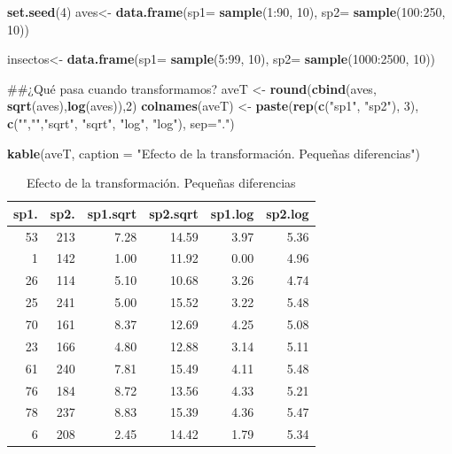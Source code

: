 \documentclass[]{book}
\newenvironment{Shaded}{\begin{snugshade}}{\end{snugshade}}
\newcommand{\KeywordTok}[1]{\textcolor[rgb]{0.13,0.29,0.53}{\textbf{{#1}}}}
\newcommand{\DataTypeTok}[1]{\textcolor[rgb]{0.13,0.29,0.53}{{#1}}}
\newcommand{\DecValTok}[1]{\textcolor[rgb]{0.00,0.00,0.81}{{#1}}}
\newcommand{\StringTok}[1]{\textcolor[rgb]{0.31,0.60,0.02}{{#1}}}
\newcommand{\NormalTok}[1]{{#1}}
\begin{document}
\begin{Shaded}
\begin{Highlighting}[]
\KeywordTok{set.seed}\NormalTok{(}\DecValTok{4}\NormalTok{)}
\NormalTok{aves<-}\StringTok{ }\KeywordTok{data.frame}\NormalTok{(}\DataTypeTok{sp1=} \KeywordTok{sample}\NormalTok{(}\DecValTok{1}\NormalTok{:}\DecValTok{90}\NormalTok{, }\DecValTok{10}\NormalTok{), }\DataTypeTok{sp2=} \KeywordTok{sample}\NormalTok{(}\DecValTok{100}\NormalTok{:}\DecValTok{250}\NormalTok{, }\DecValTok{10}\NormalTok{))}

\NormalTok{insectos<-}\StringTok{ }\KeywordTok{data.frame}\NormalTok{(}\DataTypeTok{sp1=} \KeywordTok{sample}\NormalTok{(}\DecValTok{5}\NormalTok{:}\DecValTok{99}\NormalTok{, }\DecValTok{10}\NormalTok{), }\DataTypeTok{sp2=} \KeywordTok{sample}\NormalTok{(}\DecValTok{1000}\NormalTok{:}\DecValTok{2500}\NormalTok{, }\DecValTok{10}\NormalTok{))}

\NormalTok{##¿Qué pasa cuando transformamos?}
\NormalTok{aveT <-}\StringTok{ }\KeywordTok{round}\NormalTok{(}\KeywordTok{cbind}\NormalTok{(aves, }\KeywordTok{sqrt}\NormalTok{(aves),}\KeywordTok{log}\NormalTok{(aves)),}\DecValTok{2}\NormalTok{)}
\KeywordTok{colnames}\NormalTok{(aveT) <-}\StringTok{ }\KeywordTok{paste}\NormalTok{(}\KeywordTok{rep}\NormalTok{(}\KeywordTok{c}\NormalTok{(}\StringTok{"sp1"}\NormalTok{, }\StringTok{"sp2"}\NormalTok{), }\DecValTok{3}\NormalTok{), }\KeywordTok{c}\NormalTok{(}\StringTok{""}\NormalTok{,}\StringTok{""}\NormalTok{,}\StringTok{"sqrt"}\NormalTok{, }\StringTok{"sqrt"}\NormalTok{, }\StringTok{"log"}\NormalTok{, }\StringTok{"log"}\NormalTok{), }\DataTypeTok{sep=}\StringTok{"."}\NormalTok{)}

\KeywordTok{kable}\NormalTok{(aveT, }\DataTypeTok{caption =} \StringTok{"Efecto de la transformación. Pequeñas diferencias"}\NormalTok{)}
\end{Highlighting}
\end{Shaded}

\begin{table}[t]

\caption{\label{tab:unnamed-chunk-16}Efecto de la transformación. Pequeñas diferencias}
\centering
\begin{tabular}{r|r|r|r|r|r}
\hline
sp1. & sp2. & sp1.sqrt & sp2.sqrt & sp1.log & sp2.log\\
\hline
53 & 213 & 7.28 & 14.59 & 3.97 & 5.36\\
\hline
1 & 142 & 1.00 & 11.92 & 0.00 & 4.96\\
\hline
26 & 114 & 5.10 & 10.68 & 3.26 & 4.74\\
\hline
25 & 241 & 5.00 & 15.52 & 3.22 & 5.48\\
\hline
70 & 161 & 8.37 & 12.69 & 4.25 & 5.08\\
\hline
23 & 166 & 4.80 & 12.88 & 3.14 & 5.11\\
\hline
61 & 240 & 7.81 & 15.49 & 4.11 & 5.48\\
\hline
76 & 184 & 8.72 & 13.56 & 4.33 & 5.21\\
\hline
78 & 237 & 8.83 & 15.39 & 4.36 & 5.47\\
\hline
6 & 208 & 2.45 & 14.42 & 1.79 & 5.34\\
\hline
\end{tabular}
\end{table}
\end{document}
